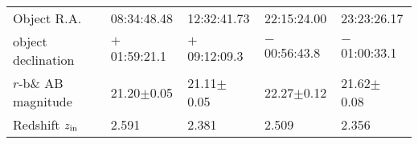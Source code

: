 \clearpage
\begin{tabular}{l|l|l|l|l}
Object R.A.                      & 08:34:48.48         & 12:32:41.73           & 22:15:24.00          & 23:23:26.17     \\
object declination           & $+$01:59:21.1     & $+$09:12:09.3      & $-$00:56:43.8      & $-$01:00:33.1  \\
$r$-b\& AB magnitude   & 21.20$\pm$0.05  & 21.11$\pm$ 0.05  & 22.27$\pm$0.12  & 21.62$\pm$ 0.08 \\  
Redshift $z_{\rm in}$        &  2.591                   &  2.381                    &  2.509                  &  2.356 \\  
\end{tabular}
